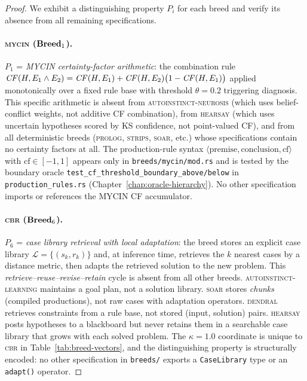 \begin{proof}
We exhibit a distinguishing property $P_i$ for each breed and verify its absence from
all remaining specifications.

\paragraph{\textsc{mycin} ($\mathbf{Breed}_1$).}
$P_1$ = \emph{MYCIN certainty-factor arithmetic}: the combination rule
$\mathit{CF}(H, E_1 \wedge E_2) = \mathit{CF}(H,E_1) + \mathit{CF}(H,E_2)\bigl(1 - \mathit{CF}(H,E_1)\bigr)$
applied monotonically over a fixed rule base with threshold $\theta = 0.2$ triggering
diagnosis. This specific arithmetic is absent from \textsc{autoinstinct-neurosis} (which
uses belief-conflict weights, not additive CF combination), from \textsc{hearsay} (which
uses uncertain hypotheses scored by KS confidence, not point-valued CF), and from all
deterministic breeds (\textsc{prolog}, \textsc{strips}, \textsc{soar}, etc.) whose
specifications contain no certainty factors at all. The production-rule syntax $\langle\text{premise}, \text{conclusion},
\text{cf}\rangle$ with $\mathrm{cf} \in [-1,1]$ appears only in
\texttt{breeds/mycin/mod.rs} and is tested by the boundary oracle
\texttt{test\_cf\_threshold\_boundary\_above/below} in \texttt{production\_rules.rs}
(Chapter~\ref{chap:oracle-hierarchy}). No other specification imports or references the
MYCIN CF accumulator.

\paragraph{\textsc{cbr} ($\mathbf{Breed}_6$).}
$P_6$ = \emph{case library retrieval with local adaptation}: the breed stores an
explicit case library $\mathcal{L} = \{(s_k, r_k)\}$ and, at inference time, retrieves
the $k$ nearest cases by a distance metric, then adapts the retrieved solution to the
new problem. This \emph{retrieve–reuse–revise–retain} cycle is absent from all other
breeds. \textsc{autoinstinct-learning} maintains a goal plan, not a solution library.
\textsc{soar} stores \emph{chunks} (compiled productions), not raw cases with adaptation
operators. \textsc{dendral} retrieves constraints from a rule base, not stored (input,
solution) pairs. \textsc{hearsay} posts hypotheses to a blackboard but never retains
them in a searchable case library that grows with each solved problem. The $\kappa = 1.0$ coordinate is unique to \textsc{cbr} in
Table~\ref{tab:breed-vectors}, and the distinguishing property is structurally encoded:
no other specification in \texttt{breeds/} exports a \texttt{CaseLibrary} type or an
\texttt{adapt()} operator.


\end{proof}
